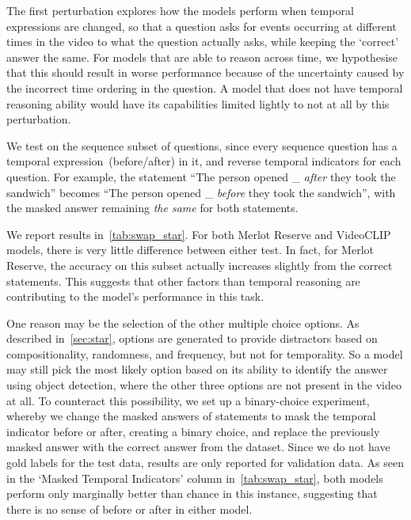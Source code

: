 The first perturbation explores how the models perform when temporal
expressions are changed, so that a question asks for events occurring at
different times in the video to what the question actually asks, while keeping
the `correct' answer the same. For models that are able to reason across time,
we hypothesise that this should result in worse performance because of the
uncertainty caused by the incorrect time ordering in the question. A model that
does not have temporal reasoning ability would have its capabilities limited
lightly to not at all by this perturbation.

We test on the sequence subset of questions, since every sequence question has
a temporal expression~(before/after) in it, and reverse temporal indicators for
each question. For example, the statement ``The person opened \_ \emph{after}
they took the sandwich'' becomes ``The person opened \_ \emph{before} they took
the sandwich'', with the masked answer remaining \emph{the same} for both
statements.

We report results in~\cref{tab:swap_star}. For both Merlot Reserve and
VideoCLIP models, there is very little difference between either test. In fact,
for Merlot Reserve, the accuracy on this subset actually increases slightly
from the correct statements. This suggests that other factors than temporal
reasoning are contributing to the model's performance in this task.

One reason may be the selection of the other multiple choice options. As
described in~\cref{sec:star}, options are generated to provide distractors
based on compositionality, randomness, and frequency, but not for temporality.
So a model may still pick the most likely option based on its ability to
identify the answer using object detection, where the other three options are
not present in the video at all. To counteract this possibility, we set up a
binary-choice experiment, whereby we change the masked answers of statements to
mask the temporal indicator before or after, creating a binary choice, and
replace the previously masked answer with the correct answer from the dataset.
Since we do not have gold labels for the test data, results are only reported
for validation data. As seen in the `Masked Temporal Indicators' column
in~\cref{tab:swap_star}, both models perform only marginally better than chance
in this instance, suggesting that there is no sense of before or after in
either model.

